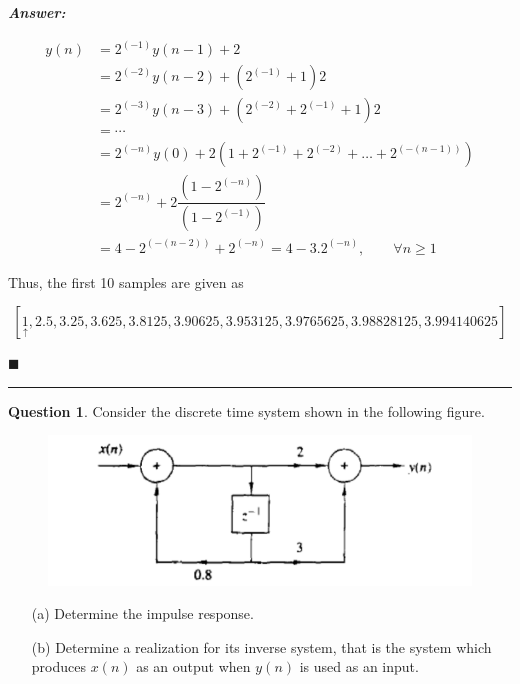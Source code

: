 \documentclass[12pt]{article}
\theoremstyle{definition}
\newtheorem{question}{Question}
\newenvironment{answer}{
    \textbf{\textit{Answer:}} \qquad
}{\hfill $\blacksquare$ \\ 

\begin{center}
    \rule{0.8\linewidth}{1.5px} 
    \vspace*{1cm}   
\end{center}
}
\newcommand{\inv}[1][1]{^{(- #1)}}
\begin{document}
\begin{answer}
\begin{enumerate}
        \begin{align*}
            y(n) 
            & = 2\inv y(n-1) + 2\\
            & = 2\inv[2] y(n-2) + (2\inv + 1) 2\\
            & = 2\inv[3] y(n-3) + (2\inv[2] + 2\inv + 1)2\\
            & = \cdots \\
            & = 2\inv[n] y(0) + 2 (1 + 2\inv + 2\inv[2] + \dots + 2\inv[(n-1)])\\
            & = 2\inv[n] + 2 \dfrac{(1 - 2\inv[n])}{(1 - 2\inv)}\\
            & = 4 - 2\inv[(n-2)] + 2\inv[n] = 4 - 3.2\inv[n], \qquad \forall n \geq 1
        \end{align*}

        Thus, the first 10 samples are given as 

        $$
        \left[ \underset{\uparrow}{1}, 2.5, 3.25, 3.625, 3.8125,
        3.90625,
        3.953125,
        3.9765625,
        3.98828125,
        3.994140625 \right]
        $$


    \end{enumerate}
    
\end{answer}



\begin{question}
    Consider the discrete time system shown in the following figure.

    \begin{figure}[H]
        \centering
        \includegraphics[width = 0.8\linewidth]{q_figure2.png}
    \end{figure}

    \begin{enumerate}
        \item[(a)] Determine the impulse response.
        \item[(b)] Determine a realization for its inverse system, that is the system which produces $x(n)$ as an output when $y(n)$ is used as an input. 
    \end{enumerate}
\end{question}
\end{document}
